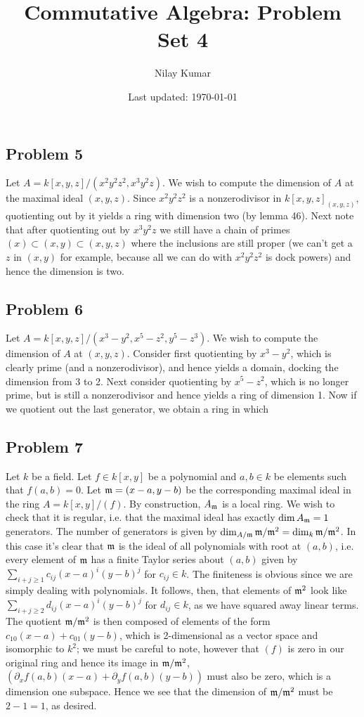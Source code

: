 \documentclass{../../mathnotes}
\title{Commutative Algebra: Problem Set 4}
\author{Nilay Kumar}
\date{Last updated: \today}
\begin{document}
\maketitle


\subsection*{Problem 5}

Let $A=k[x,y,z]/(x^2y^2z^2, x^3y^2z)$. We wish to compute the dimension of $A$ at the maximal ideal $(x,y,z)$.
Since $x^2y^2z^2$ is a nonzerodivisor in $k[x,y,z]_{(x,y,z)}$, quotienting out by it yields a ring with dimension two (by lemma 46).
Next note that after quotienting out by $x^3y^2z$ we still have a chain of primes $(x)\subset (x,y)\subset (x,y,z)$ where the inclusions
are still proper (we can't get a $z$ in $(x,y)$ for example, because all we can do with $x^2y^2z^2$ is dock powers) and hence the dimension is two.


\subsection*{Problem 6}

Let $A=k[x,y,z]/(x^3-y^2,x^5-z^2,y^5-z^3)$. We wish to compute the dimension of $A$ at $(x,y,z)$. Consider first quotienting by $x^3-y^2$, which
is clearly prime (and a nonzerodivisor), and hence yields a domain, docking the dimension from 3 to 2. Next consider quotienting by $x^5-z^2$, which
is no longer prime, but is still a nonzerodivisor and hence yields a ring of dimension 1. Now if we quotient out the last generator, we obtain a ring in which


\subsection*{Problem 7}

Let $k$ be a field. Let $f\in k[x,y]$ be a polynomial and $a,b\in k$ be elements such that $f(a,b)=0$.
Let $\mathfrak m=(x-a,y-b)$ be the corresponding maximal ideal in the ring $A=k[x,y]/(f)$. By construction, $A_\mathfrak m$ is a local ring.
We wish to check that it is regular, i.e. that the maximal ideal has exactly $\dim A_\mathfrak m=1$ generators. The number of generators is given
by $\dim_{A/\mathfrak m}\mathfrak m/\mathfrak m^2=\dim_k\mathfrak m/\mathfrak m^2$. In this case it's clear that $\mathfrak m$ is the ideal of all polynomials with root
at $(a,b)$, i.e. every element of $\mathfrak m$ has a finite Taylor series about $(a,b)$ given by $\sum_{i+j\geq 1}c_{ij}(x-a)^i(y-b)^j$ for $c_{ij}\in k$.
The finiteness is obvious since we are simply dealing with polynomials.
It follows, then, that elements of $\mathfrak m^2$ look like $\sum_{i+j\geq 2}d_{ij}(x-a)^i(y-b)^j$ for $d_{ij}\in k$, as we have squared away linear terms.
The quotient $\mathfrak m/\mathfrak m^2$ is then composed of elements of the form $c_{10}(x-a)+c_{01}(y-b)$, which is 2-dimensional as a vector space and isomorphic to $k^2$;
we must be careful to note, however that $(f)$
is zero in our original ring and hence its image in $\mathfrak m/\mathfrak m^2$, $(\partial_x f(a,b)(x-a)+\partial_y f(a,b)(y-b))$ must also be zero, which is a dimension one subspace. Hence we see that
the dimension of $\mathfrak m/\mathfrak m^2$ must be $2-1=1$, as desired.
\end{document}
